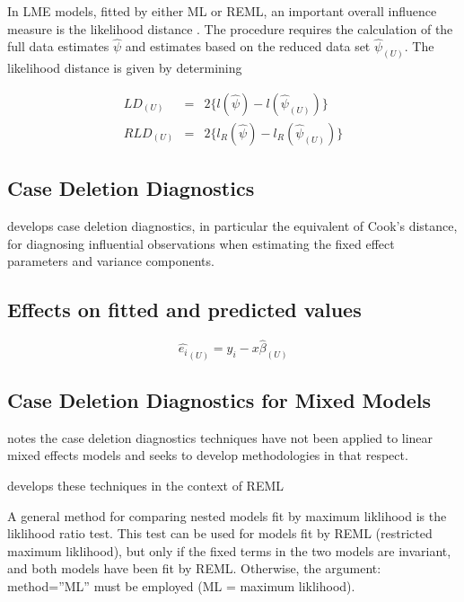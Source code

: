 \documentclass[MAIN.tex]{subfiles}
\begin{document}
In LME models, fitted by either ML or REML, an important overall
influence measure is the likelihood distance \citep{cook82}. The
procedure requires the calculation of the full data estimates
$\hat{\psi}$ and estimates based on the reduced data set
$\hat{\psi}_{(U)}$. The likelihood distance is given by
determining


\begin{eqnarray}
LD_{(U)} &=& 2\{l(\hat{\psi}) - l( \hat{\psi}_{(U)}) \}\\
RLD_{(U)} &=& 2\{l_{R}(\hat{\psi}) - l_{R}(\hat{\psi}_{(U)})\}
\end{eqnarray}



\newpage
\subsection{Case Deletion Diagnostics} %


\citet{CPJ} develops  case deletion diagnostics, in particular the equivalent of  Cook's distance, for diagnosing influential observations when estimating the fixed effect parameters and variance components.

\subsection{Effects on fitted and predicted values}
\begin{equation}
\hat{e_{i}}_{(U)} = y_{i} - x\hat{\beta}_{(U)}
\end{equation}




\subsection{Case Deletion Diagnostics for Mixed Models}

\citet{Christiansen} notes the case deletion diagnostics techniques have not been applied to linear mixed effects models and seeks to develop methodologies in that respect.

\citet{Christiansen} develops these techniques in the context of REML

\newpage




A general method for comparing nested models fit by maximum liklihood is the liklihood ratio 
test. This test can be used for models fit by REML (restricted maximum liklihood), but only if the 
fixed terms in the two models are invariant, and both models have been fit by REML. Otherwise, 
the argument: method=”ML” must be employed (ML = maximum liklihood). 
\end{document}

